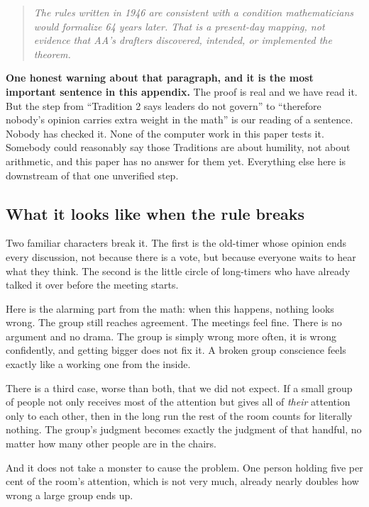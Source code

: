 \documentclass[11pt,a4paper]{article}
\begin{document}
\begin{quote}\itshape
The rules written in 1946 are consistent with a condition mathematicians would
formalize 64 years later. That is a present-day mapping, not evidence that AA's
drafters discovered, intended, or implemented the theorem.
\end{quote}

\textbf{One honest warning about that paragraph, and it is the most important
sentence in this appendix.} The proof is real and we have read it. But the step
from ``Tradition 2 says leaders do not govern'' to ``therefore nobody's opinion
carries extra weight in the math'' is our reading of a sentence. Nobody has
checked it. None of the computer work in this paper tests it. Somebody could
reasonably say those Traditions are about humility, not about arithmetic, and this
paper has no answer for them yet. Everything else here is downstream of that one
unverified step.

\subsection{What it looks like when the rule breaks}

Two familiar characters break it. The first is the old-timer whose opinion ends
every discussion, not because there is a vote, but because everyone waits to hear
what they think. The second is the little circle of long-timers who have already
talked it over before the meeting starts.

Here is the alarming part from the math: when this happens, nothing looks wrong.
The group still reaches agreement. The meetings feel fine. There is no argument
and no drama. The group is simply wrong more often, it is wrong confidently, and
getting bigger does not fix it. A broken group conscience feels exactly like a
working one from the inside.

There is a third case, worse than both, that we did not expect. If a small group
of people not only receives most of the attention but gives all of \emph{their}
attention only to each other, then in the long run the rest of the room counts for
literally nothing. The group's judgment becomes exactly the judgment of that
handful, no matter how many other people are in the chairs.

And it does not take a monster to cause the problem. One person holding five per
cent of the room's attention, which is not very much, already nearly doubles how
wrong a large group ends up.
\end{document}

